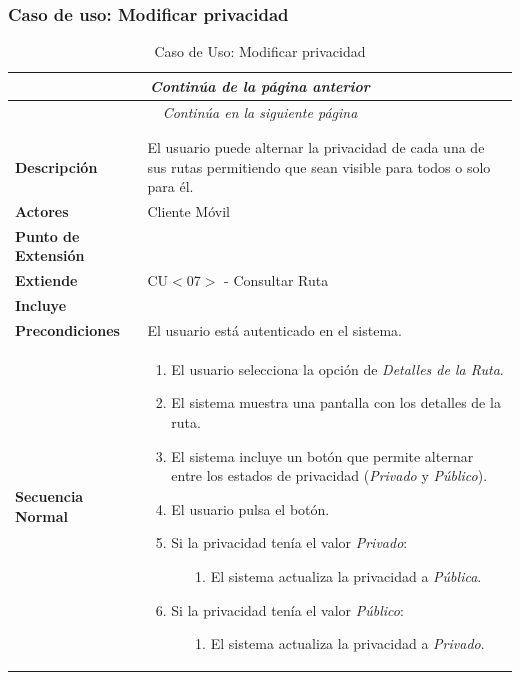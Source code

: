 \subsubsection*{Caso de uso: Modificar privacidad}
\begin{longtable}{| p{4cm} | p{10cm} |}
\endfirsthead
\multicolumn{2}{c}{\textit{Continúa de la página anterior}}\\[12pt]
\hline
\endhead
\hline
\multicolumn{2}{c}{\textit{Continúa en la siguiente página}} \\
\endfoot
\hline
\caption{Caso de Uso: Modificar privacidad}\label{fig:1}\\
\endlastfoot


\hline
\multicolumn{2}{|c|}{\textbf{CU$<$09$>$ - Modificar Privacidad}} \\

\hline
\textbf{Descripción} &
El usuario puede alternar la privacidad de cada una de sus rutas permitiendo que sean visible para todos o solo para él.\\

\hline
\textbf{Actores} &
Cliente Móvil\\

\hline
\textbf{Punto de Extensión} &
\\

\hline
\textbf{Extiende} &
CU$<$07$>$ - Consultar Ruta
\\

\hline
\textbf{Incluye} &
\\

\hline
\textbf{Precondiciones} &
El usuario está autenticado en el sistema.\\

\hline
\textbf{Secuencia Normal} &\mbox{}\par\vspace{-\baselineskip}
\begin{enumerate}[leftmargin=0.7cm, topsep=0.1cm]
\item El usuario selecciona la opción de \textit{Detalles de la Ruta}.
\item El sistema muestra una pantalla con los detalles de la ruta.
\item El sistema incluye un botón que permite alternar entre los estados de privacidad (\textit{Privado} y \textit{Público}).
\item El usuario pulsa el botón.
\item Si la privacidad tenía el valor \textit{Privado}:
	\begin{itemize}
	\item[1.] El sistema actualiza la privacidad a \textit{Pública}.
	\end{itemize}
\item Si la privacidad tenía el valor \textit{Público}:
	\begin{itemize}
	\item[1.] El sistema actualiza la privacidad a \textit{Privado}.
	\end{itemize}
\end{enumerate}\\


\end{longtable}
